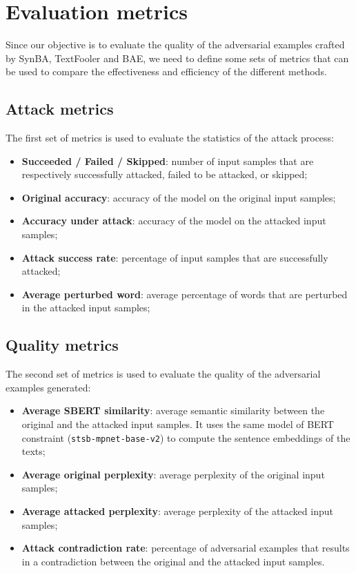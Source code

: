 \section{Evaluation metrics}\label{sec:evaluation-metrics}

Since our objective is to evaluate the quality of the adversarial examples crafted by SynBA, TextFooler and BAE, 
we need to define some sets of metrics that can be used to compare the effectiveness and efficiency of the different methods.

\subsection{Attack metrics}\label{subsec:attack-metrics}

The first set of metrics is used to evaluate the statistics of the attack process:
\begin{itemize}
    \item \textbf{Succeeded / Failed / Skipped}: number of input samples that are respectively successfully attacked, failed to be attacked, or skipped;
    \item \textbf{Original accuracy}: accuracy of the model on the original input samples;
    \item \textbf{Accuracy under attack}: accuracy of the model on the attacked input samples;
    \item \textbf{Attack success rate}: percentage of input samples that are successfully attacked;
    \item \textbf{Average perturbed word}: average percentage of words that are perturbed in the attacked input samples;
\end{itemize}

\subsection{Quality metrics}\label{subsec:quality-metrics}

The second set of metrics is used to evaluate the quality of the adversarial examples generated:
\begin{itemize}
    \item \textbf{Average SBERT similarity}: average semantic similarity between the original and the attacked input samples. It uses the same model of BERT constraint (\texttt{stsb-mpnet-base-v2}) to compute the sentence embeddings of the texts;
    \item \textbf{Average original perplexity}: average perplexity of the original input samples;
    \item \textbf{Average attacked perplexity}: average perplexity of the attacked input samples;
    \item \textbf{Attack contradiction rate}: percentage of adversarial examples that results in a contradiction between the original and the attacked input samples.
\end{itemize}


